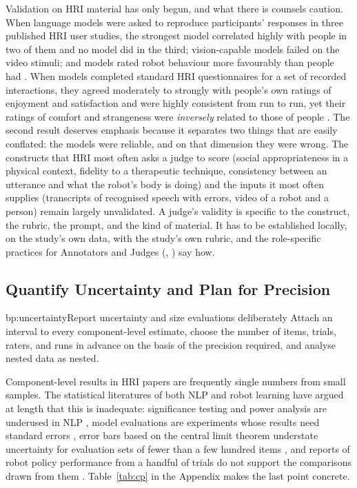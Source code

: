 Validation on HRI material has only begun, and what there is counsels
caution. When language models were asked to reproduce participants'
responses in three published HRI user studies, the strongest model
correlated highly with people in two of them and no model did in the third;
vision-capable models failed on the video stimuli; and models rated robot
behaviour more favourably than people had \cite{wachowiak2024large}. When
models completed standard HRI questionnaires for a set of recorded
interactions, they agreed moderately to strongly with people's own ratings of
enjoyment and satisfaction and were highly consistent from run to run, yet their ratings of
comfort and strangeness were \emph{inversely} related to those of people
\cite{lockwood2026when}. The second result deserves emphasis because it
separates two things that are easily conflated: the models were reliable,
and on that dimension they were wrong. The constructs that HRI most often
asks a judge to score (social appropriateness in a physical context,
fidelity to a therapeutic technique, consistency between an utterance and
what the robot's body is doing) and the inputs it most often supplies
(transcripts of recognised speech with errors, video of a robot and a
person) remain largely unvalidated. A judge's validity is specific to the construct, the rubric, the
prompt, and the kind of material. It has to be established locally, on the
study's own data, with the study's own rubric, and the role-specific
practices for Annotators and Judges (, ) say how.

\subsection{Quantify Uncertainty and Plan for Precision}

\begin{practice}{bp:uncertainty}{Report uncertainty and size evaluations deliberately}
Attach an interval to every component-level estimate, choose the number of
items, trials, raters, and runs in advance on the basis of the precision
required, and analyse nested data as nested.
\end{practice}

Component-level results in HRI papers are frequently single numbers from
small samples. The statistical literatures of both NLP and robot learning have
argued at length that this is inadequate: significance testing and power
analysis are underused in NLP \cite{dror2018hitchhikers,card2020with}, model
evaluations are experiments whose results need standard errors
\cite{miller2024adding}, error bars based on the central limit theorem
understate uncertainty for evaluation sets of fewer than a few hundred items
\cite{bowyer2025position}, and reports of robot policy performance from a
handful of trials do not support the comparisons drawn from them
\cite{kressgazit2024robot,agarwal2021deep}. Table~\ref{tab:cp} in the Appendix
makes the last point concrete.

